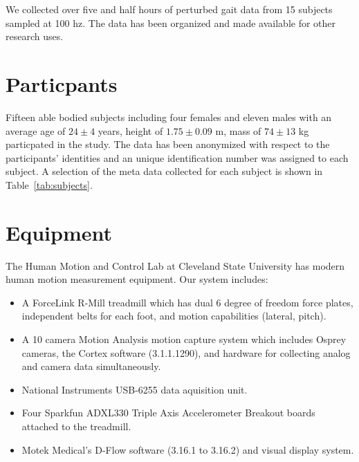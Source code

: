 \documentclass[10pt,a4paper,twocolumn]{article}
\begin{document}
We collected over five and half hours of perturbed gait data from 15 subjects
sampled at 100 hz. The data has been organized and made available for other
research uses.

\section*{Particpants}
%
Fifteen able bodied subjects including four females and eleven males with an
average age of $24\pm4$ years, height of $1.75\pm0.09$ m, mass of $74\pm13$ kg
particpated in the study. The data has been anonymized with respect to the
participants' identities and an unique identification number was assigned to
each subject. A selection of the meta data collected for each subject is shown
in Table~\ref{tab:subjects}.
%
\begin{table}
  \cprotect\caption{Information about the 15 participants. The final three
    columns give the trial numbers associated with each nominal treadmill
    speed. Additional trials with subject 0 are trials with no subject, i.e.
    unloaded trials that can be used for force compensation purposes, and are
    not shown in the table. Generated by \verb|src/subject_table.py|.}
  \centering
  
  \label{tab:subjects}
\end{table}

\section*{Equipment}
%
The Human Motion and Control Lab at Cleveland State University has modern human
motion measurement equipment. Our system includes:

\begin{itemize}
  \item A ForceLink R-Mill treadmill which has dual 6 degree of freedom force
    plates, independent belts for each foot, and motion capabilities (lateral,
    pitch).
  \item A 10 camera Motion Analysis motion capture system which includes Osprey
    cameras, the Cortex software (3.1.1.1290), and hardware for collecting
    analog and camera data simultaneously.
  \item National Instruments USB-6255 data aquisition unit.
  \item Four Sparkfun ADXL330 Triple Axis Accelerometer Breakout boards
    attached to the treadmill.
  \item Motek Medical’s D-Flow software (3.16.1 to 3.16.2) and visual display
    system.
\end{itemize}
\end{document}
